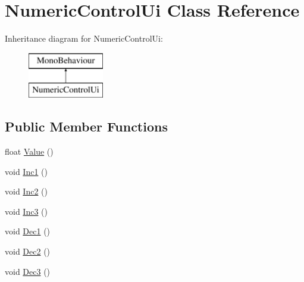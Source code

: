 \hypertarget{class_numeric_control_ui}{}\section{Numeric\+Control\+Ui Class Reference}
\label{class_numeric_control_ui}
Inheritance diagram for Numeric\+Control\+Ui\+:\begin{figure}[H]
\begin{center}
\leavevmode
\includegraphics[height=2.000000cm]{class_numeric_control_ui}
\end{center}
\end{figure}
\subsection*{Public Member Functions}
\begin{DoxyCompactItemize}
\item 
float \mbox{\hyperlink{class_numeric_control_ui_a03d4bf8f932d9ef9f7b8dee2626487b0}{Value}} ()
\item 
void \mbox{\hyperlink{class_numeric_control_ui_acbca58e1608cef5a26dd50f27804b55a}{Inc1}} ()
\item 
void \mbox{\hyperlink{class_numeric_control_ui_a2c6f6262aa2610841deae715120b5ac4}{Inc2}} ()
\item 
void \mbox{\hyperlink{class_numeric_control_ui_a24bb521b7ba4f796cd17d8897f654f5c}{Inc3}} ()
\item 
void \mbox{\hyperlink{class_numeric_control_ui_a9c8c73af6395bdf852b9b0accceee765}{Dec1}} ()
\item 
void \mbox{\hyperlink{class_numeric_control_ui_a57c1bbd7814a56164695ce2eaddc24df}{Dec2}} ()
\item 
void \mbox{\hyperlink{class_numeric_control_ui_acc9c65621a2fe11e5a05ebc0b79fb3dd}{Dec3}} ()
\end{DoxyCompactItemize}
